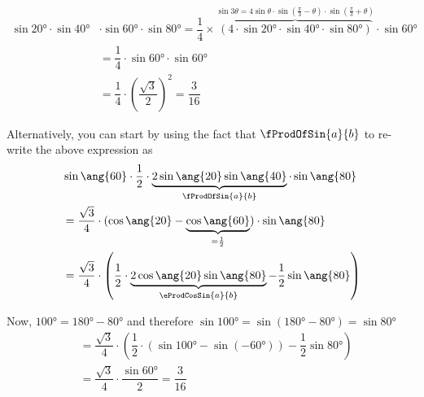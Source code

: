 \begin{solution}[\halfpage]
	\begin{fullwidth}
    \begin{align}
       \sin\ang{20}\cdot\sin\ang{40}&\cdot\sin\ang{60}\cdot\sin\ang{80} = 
       \dfrac{1}{4}\times\overbrace{(4\cdot\sin\ang{20}\cdot\sin\ang{40}\cdot\sin\ang{80})}
       ^{\sin 3\theta = 4\sin\theta\cdot\sin\left( \frac{\pi}{3} - \theta\right)\cdot\sin\left(\frac{\pi}{3} +
        \theta\right)}\cdot\sin\ang{60} \\
       &= \dfrac{1}{4}\cdot\sin\ang{60}\cdot\sin\ang{60} \\
       &= \dfrac{1}{4}\cdot\left(\dfrac{\sqrt{3}}{2} \right)^2 = \dfrac{3}{16}
    \end{align}
    
    Alternatively, you can start by using the fact that $\fProdOfSin{a}{b}$ to re-write the above expression as
    \begin{align}
    	&\sin\ang{60}\cdot\dfrac{1}{2}\cdot \underbrace{2\sin\ang{20}\sin\ang{40}}_{\fProdOfSin{a}{b}}\cdot\sin\ang{80} \\
    	&= \dfrac{\sqrt{3}}{4}\cdot(\cos\ang{20}-\underbrace{\cos\ang{60}}_{= \frac{1}{2}})\cdot\sin\ang{80} \\
    	&= \dfrac{\sqrt{3}}{4}\cdot\left(\dfrac{1}{2}\cdot \underbrace{2\cos\ang{20}\sin\ang{80}}
    	_{\eProdCosSin{a}{b}} - \dfrac{1}{2}\sin\ang{80}\right)
    \end{align}
    
    Now, $ \ang{100} = \ang{180}-\ang{80}$ and therefore $\sin\ang{100} = \sin(\ang{180}-\ang{80}) = \sin\ang{80}$
    \begin{align}
    	&= \dfrac{\sqrt{3}}{4}\cdot\left( \dfrac{1}{2}\cdot(\sin\ang{100} - \sin(\ang{-60}))
    	-\dfrac{1}{2}\sin\ang{80}\right) \\
    	&= \dfrac{\sqrt{3}}{4}\cdot\dfrac{\sin\ang{60}}{2} = \dfrac{3}{16}
    \end{align}
    \end{fullwidth}
\end{solution}
